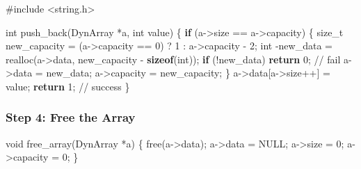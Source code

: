 \documentclass[
  letterpaper,
  DIV=11,
  numbers=noendperiod]{scrreprt}
\newenvironment{Shaded}{\begin{snugshade}}{\end{snugshade}}
\newcommand{\CommentTok}[1]{\textcolor[rgb]{0.37,0.37,0.37}{#1}}
\newcommand{\ControlFlowTok}[1]{\textcolor[rgb]{0.00,0.23,0.31}{\textbf{#1}}}
\newcommand{\DataTypeTok}[1]{\textcolor[rgb]{0.68,0.00,0.00}{#1}}
\newcommand{\DecValTok}[1]{\textcolor[rgb]{0.68,0.00,0.00}{#1}}
\newcommand{\ImportTok}[1]{\textcolor[rgb]{0.00,0.46,0.62}{#1}}
\newcommand{\KeywordTok}[1]{\textcolor[rgb]{0.00,0.23,0.31}{\textbf{#1}}}
\newcommand{\NormalTok}[1]{\textcolor[rgb]{0.00,0.23,0.31}{#1}}
\newcommand{\OperatorTok}[1]{\textcolor[rgb]{0.37,0.37,0.37}{#1}}
\newcommand{\PreprocessorTok}[1]{\textcolor[rgb]{0.68,0.00,0.00}{#1}}
\begin{document}
\begin{Shaded}
\begin{Highlighting}[]
\PreprocessorTok{\#include }\ImportTok{\textless{}string.h\textgreater{}}

\DataTypeTok{int}\NormalTok{ push\_back}\OperatorTok{(}\NormalTok{DynArray }\OperatorTok{*}\NormalTok{a}\OperatorTok{,} \DataTypeTok{int}\NormalTok{ value}\OperatorTok{)} \OperatorTok{\{}
    \ControlFlowTok{if} \OperatorTok{(}\NormalTok{a}\OperatorTok{{-}\textgreater{}}\NormalTok{size }\OperatorTok{==}\NormalTok{ a}\OperatorTok{{-}\textgreater{}}\NormalTok{capacity}\OperatorTok{)} \OperatorTok{\{}
        \DataTypeTok{size\_t}\NormalTok{ new\_capacity }\OperatorTok{=} \OperatorTok{(}\NormalTok{a}\OperatorTok{{-}\textgreater{}}\NormalTok{capacity }\OperatorTok{==} \DecValTok{0}\OperatorTok{)} \OperatorTok{?} \DecValTok{1} \OperatorTok{:}\NormalTok{ a}\OperatorTok{{-}\textgreater{}}\NormalTok{capacity }\OperatorTok{{-}} \DecValTok{2}\OperatorTok{;}
        \DataTypeTok{int} \OperatorTok{{-}}\NormalTok{new\_data }\OperatorTok{=}\NormalTok{ realloc}\OperatorTok{(}\NormalTok{a}\OperatorTok{{-}\textgreater{}}\NormalTok{data}\OperatorTok{,}\NormalTok{ new\_capacity }\OperatorTok{{-}} \KeywordTok{sizeof}\OperatorTok{(}\DataTypeTok{int}\OperatorTok{));}
        \ControlFlowTok{if} \OperatorTok{(!}\NormalTok{new\_data}\OperatorTok{)} \ControlFlowTok{return} \DecValTok{0}\OperatorTok{;}  \CommentTok{// fail}
\NormalTok{        a}\OperatorTok{{-}\textgreater{}}\NormalTok{data }\OperatorTok{=}\NormalTok{ new\_data}\OperatorTok{;}
\NormalTok{        a}\OperatorTok{{-}\textgreater{}}\NormalTok{capacity }\OperatorTok{=}\NormalTok{ new\_capacity}\OperatorTok{;}
    \OperatorTok{\}}
\NormalTok{    a}\OperatorTok{{-}\textgreater{}}\NormalTok{data}\OperatorTok{[}\NormalTok{a}\OperatorTok{{-}\textgreater{}}\NormalTok{size}\OperatorTok{++]} \OperatorTok{=}\NormalTok{ value}\OperatorTok{;}
    \ControlFlowTok{return} \DecValTok{1}\OperatorTok{;} \CommentTok{// success}
\OperatorTok{\}}
\end{Highlighting}
\end{Shaded}

\subsubsection{Step 4: Free the Array}\label{step-4-free-the-array}

\begin{Shaded}
\begin{Highlighting}[]
\DataTypeTok{void}\NormalTok{ free\_array}\OperatorTok{(}\NormalTok{DynArray }\OperatorTok{*}\NormalTok{a}\OperatorTok{)} \OperatorTok{\{}
\NormalTok{    free}\OperatorTok{(}\NormalTok{a}\OperatorTok{{-}\textgreater{}}\NormalTok{data}\OperatorTok{);}
\NormalTok{    a}\OperatorTok{{-}\textgreater{}}\NormalTok{data }\OperatorTok{=}\NormalTok{ NULL}\OperatorTok{;}
\NormalTok{    a}\OperatorTok{{-}\textgreater{}}\NormalTok{size }\OperatorTok{=} \DecValTok{0}\OperatorTok{;}
\NormalTok{    a}\OperatorTok{{-}\textgreater{}}\NormalTok{capacity }\OperatorTok{=} \DecValTok{0}\OperatorTok{;}
\OperatorTok{\}}
\end{Highlighting}
\end{Shaded}
\end{document}
